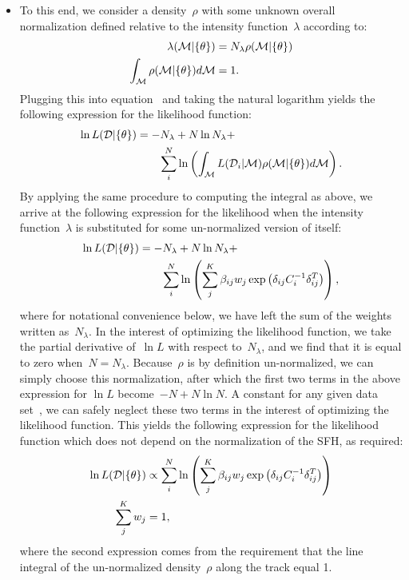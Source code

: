 \documentclass[ms.tex]{subfiles}
\begin{document}
\begin{itemize}
	\item To this end, we consider a density~$\rho$ with some unknown overall
	normalization defined relative to the intensity function~$\lambda$
	according to:
	\begin{subequations}\begin{align}
	\lambda(\mathcal{M} | \{\theta\}) &= N_\lambda \rho(\mathcal{M} | \{\theta\})
	\\
	\int_{\mathcal{M}} \rho(\mathcal{M} | \{\theta\}) d\mathcal{M} &= 1.
	\end{align}\end{subequations}
	Plugging this into equation~ and taking the natural
	logarithm yields the following expression for the likelihood function:
	\begin{equation}\begin{split}
	\ln L(\mathcal{D} | \{\theta\}) &= -N_\lambda + N \ln N_\lambda +
	\\ &\qquad
	\sum_i^N \ln \left(
	\int_{\mathcal{M}} L(\mathcal{D}_i | \mathcal{M})
	\rho(\mathcal{M} | \{\theta\}) d\mathcal{M}\right).
	\end{split}\end{equation}
	By applying the same procedure to computing the integral as above, we
	arrive at the following expression for the likelihood when the intensity
	function~$\lambda$ is substituted for some un-normalized version of itself:
	\begin{equation}\begin{split}
	\ln L(\mathcal{D} | \{\theta\}) &= -N_\lambda + N \ln N_\lambda +
	\\ &\qquad
	\sum_i^N \ln \left(\sum_j^K \beta_{ij}w_j
	\exp\left(\delta_{ij}C_i^{-1}\delta_{ij}^T\right)\right),
	\end{split}\end{equation}
	where for notational convenience below, we have left the sum of the weights
	written as~$N_\lambda$.
	In the interest of optimizing the likelihood function, we take the partial
	derivative of~$\ln L$ with respect to~$N_\lambda$, and we find that it is
	equal to zero when~$N = N_\lambda$.
	Because~$\rho$ is by definition un-normalized, we can simply choose this
	normalization, after which the first two terms in the above expression for
	$\ln L$ become~$-N + N \ln N$.
	A constant for any given data set~, we can safely neglect these
	two terms in the interest of optimizing the likelihood function.
	This yields the following expression for the likelihood function which does
	not depend on the normalization of the SFH, as required:
	\begin{subequations}\begin{align}
	\ln L(\mathcal{D} | \{\theta\}) &\propto
	\sum_i^N \ln \left(\sum_j^K
	\beta_{ij}w_j \exp\left(\delta_{ij}C_i^{-1}\delta_{ij}^T\right)\right)
	\label{eq:lnL_noweights}
	\\
	\sum_j^K w_j &= 1
	\label{eq:lnL_weightsum1},
	\end{align}\end{subequations}
	where the second expression comes from the requirement that the line
	integral of the un-normalized density~$\rho$ along the track equal 1.


\end{itemize}
\end{document}
